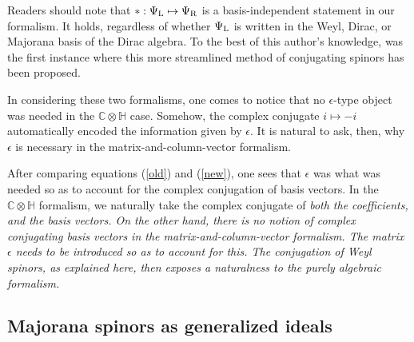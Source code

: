 \documentclass[letterpaper,12pt,titlepage,oneside,final]{book}
\newcommand{\CH}{\mathbb{C}\otimes\mathbb{H}}
\begin{document}
Readers should note that $*: \Psi_{\textup{L}}\mapsto \Psi_{\textup{R}}$ is a basis-independent statement in our formalism.  It holds, regardless of whether $\Psi_\textup{L}$ is written in the Weyl, Dirac, or Majorana basis of the Dirac algebra.   To the best of this author's knowledge, \cite{UTI} was the first instance where this more streamlined method of conjugating spinors has been proposed.   


\vspace{.3cm}


In considering these two formalisms, one comes to notice that no $\epsilon$-type object was needed in the $\CH$ case.  Somehow, the complex conjugate $i\mapsto -i$ automatically encoded the information given by $\epsilon$.  It is natural to ask, then, why $\epsilon$ is necessary in the matrix-and-column-vector formalism.

After comparing equations (\ref{old}) and (\ref{new}), one sees that $\epsilon$ was what was needed so as to account for the complex conjugation of basis vectors.  In the $\CH$ formalism, we naturally take the complex conjugate of \it both \rm the coefficients, and the basis vectors.  On the other hand, there is no notion of complex conjugating basis vectors in the matrix-and-column-vector formalism.  The matrix $\epsilon$ needs to be introduced so as to account for this.  The conjugation of Weyl spinors, as explained here, then exposes a naturalness to the purely algebraic formalism.



\subsection{Majorana spinors as generalized ideals  }

\end{document}
